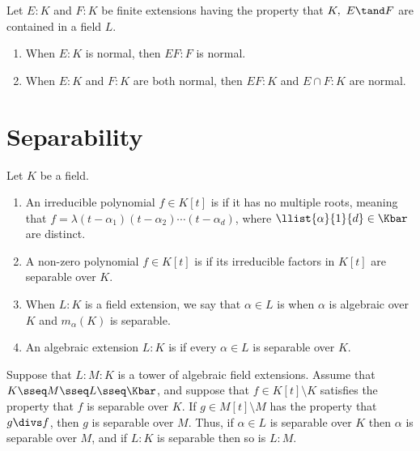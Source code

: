 \documentclass{article}
\begin{document}
  \begin{ttheorem}
    Let $ E:K $ and $ F:K $ be finite extensions having the property that $ K,\ E\tand F $ are contained in a field $ L $.
    \begin{enumerate}[label=(\alph*)]
      \item When $ E:K $ is normal, then $ EF:F $ is normal.
      \item When $ E:K $ and $ F:K $ are both normal, then $ EF:K $ and $ E\cap F:K $ are normal.
    \end{enumerate}
  \end{ttheorem}


\section{Separability} %
\setcounter{tdefinition}{24}
  \begin{tdefinition}[Separable]
    Let $ K $ be a field.
    \begin{enumerate}[label=(\roman*)]
      \item An irreducible polynomial $ f\in K[t] $ is  if it has no multiple roots, meaning that $ f=\lambda(t-\alpha_1)(t-\alpha_2)\cdots(t-\alpha_d) $, where $ \llist{\alpha}{1}{d}\in \Kbar $ are distinct.
      \item A non-zero polynomial $ f\in K[t] $ is  if its irreducible factors in $ K[t] $ are separable over $ K $.
      \item When $ L:K $ is a field extension, we say that $ \alpha \in L $ is  when $ \alpha $ is algebraic over $ K $ and $ m_\alpha(K) $ is separable.
      \item An algebraic extension $ L:K $ is  if every $ \alpha\in L $ is separable over $ K $.
    \end{enumerate}
  \end{tdefinition}

  \begin{tproposition}
    Suppose that $ L:M:K $ is a tower of algebraic field extensions.
    Assume that $ K\sseq M\sseq L\sseq \Kbar $, and suppose that $ f\in K[t]\setminus K $ satisfies the property that $ f $ is separable over $ K $.
    If $ g\in M[t]\setminus M $ has the property that $ g\divs f $, then $ g $ is separable over $ M $.
    Thus, if $ \alpha\in L $ is separable over $ K $ then $ \alpha $ is separable over $ M $, and if $ L:K $ is separable then so is $ L:M $.
  \end{tproposition}
\end{document}
